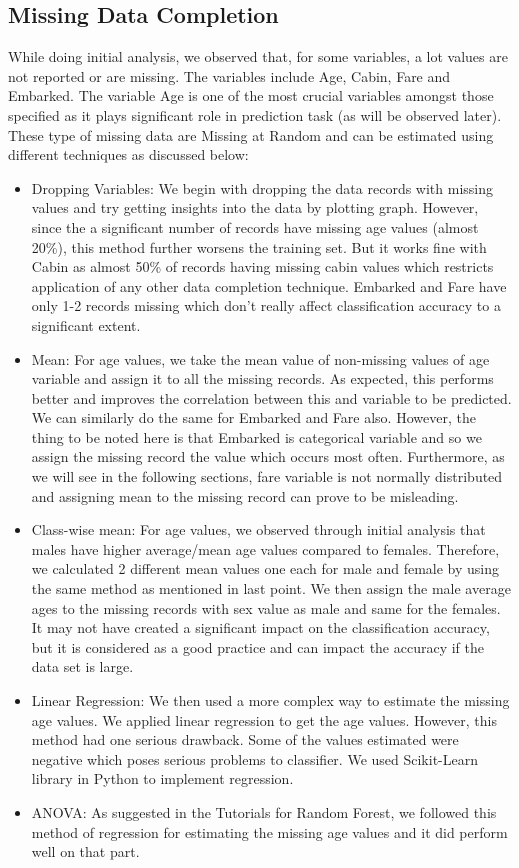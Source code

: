\subsection{Missing Data Completion}
While doing initial analysis, we observed that, for some variables, a lot values are not reported or are missing. The variables include Age, Cabin, Fare and Embarked. The variable Age is one of the most crucial variables amongst those specified as it plays significant role in prediction task (as will be observed later). These type of missing data are Missing at Random and can be estimated using different techniques as discussed below:
\begin{itemize}
\item Dropping Variables: We begin with dropping the data records with missing values and try getting insights into the data by plotting graph. However, since the a significant number of records have missing age values (almost 20\%), this method further worsens the training set. But it works fine with Cabin as almost 50\% of records having missing cabin values which restricts application of any other data completion technique. Embarked and Fare have only 1-2 records missing which don't really affect classification accuracy to a significant extent.
\item Mean: For age values, we take the mean value of non-missing values of age variable and assign it to all the missing records. As expected, this performs better and improves the correlation between this and variable to be predicted. We can similarly do the same for Embarked and Fare also. However, the thing to be noted here is that Embarked is categorical variable and so we assign the missing record the value which occurs most often. Furthermore, as we will see in the following sections, fare variable is not normally distributed and assigning mean to the missing record can prove to be misleading.
\item Class-wise mean: For age values, we observed through initial analysis that males have higher average/mean age values compared to females. Therefore, we calculated 2 different mean values one each for male and female by using the same method as mentioned in last point. We then assign the male average ages to the missing records with sex value as male and same for the females. It may not have created a significant impact on the classification accuracy, but it is considered as a good practice and can impact the accuracy if the data set is large.
\item Linear Regression: We then used a more complex way to estimate the missing age values. We applied linear regression to get the age values. However, this method had one serious drawback. Some of the values estimated were negative which poses serious problems to classifier. We used Scikit-Learn library in Python to implement regression.
\item ANOVA: As suggested in the Tutorials for Random Forest, we followed this method of regression for estimating the missing age values and it did perform well on that part.
\end{itemize}

